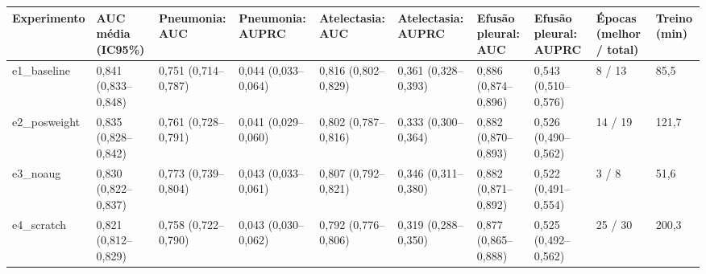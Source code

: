 \begin{tabular}{llllllllll}
\toprule
Experimento & AUC média (IC95\%) & Pneumonia: AUC & Pneumonia: AUPRC & Atelectasia: AUC & Atelectasia: AUPRC & Efusão pleural: AUC & Efusão pleural: AUPRC & Épocas (melhor / total) & Treino (min) \\
\midrule
e1\_baseline & 0,841 (0,833–0,848) & 0,751 (0,714–0,787) & 0,044 (0,033–0,064) & 0,816 (0,802–0,829) & 0,361 (0,328–0,393) & 0,886 (0,874–0,896) & 0,543 (0,510–0,576) & 8 / 13 & 85,5 \\
e2\_posweight & 0,835 (0,828–0,842) & 0,761 (0,728–0,791) & 0,041 (0,029–0,060) & 0,802 (0,787–0,816) & 0,333 (0,300–0,364) & 0,882 (0,870–0,893) & 0,526 (0,490–0,562) & 14 / 19 & 121,7 \\
e3\_noaug & 0,830 (0,822–0,837) & 0,773 (0,739–0,804) & 0,043 (0,033–0,061) & 0,807 (0,792–0,821) & 0,346 (0,311–0,380) & 0,882 (0,871–0,892) & 0,522 (0,491–0,554) & 3 / 8 & 51,6 \\
e4\_scratch & 0,821 (0,812–0,829) & 0,758 (0,722–0,790) & 0,043 (0,030–0,062) & 0,792 (0,776–0,806) & 0,319 (0,288–0,350) & 0,877 (0,865–0,888) & 0,525 (0,492–0,562) & 25 / 30 & 200,3 \\
\bottomrule
\end{tabular}
